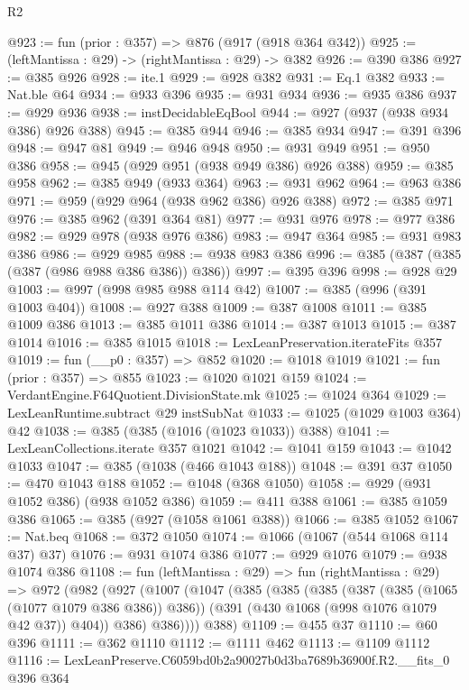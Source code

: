 \begin{lexlean}{R2}
\begin{coremodule}
@923 := fun (prior : @357) => @876 (@917 (@918 @364 @342))
@925 := (leftMantissa : @29) -> (rightMantissa : @29) -> @382
@926 := @390 @386
@927 := @385 @926
@928 := ite.{1}
@929 := @928 @382
@931 := Eq.{1} @382
@933 := Nat.ble @64
@934 := @933 @396
@935 := @931 @934
@936 := @935 @386
@937 := @929 @936
@938 := instDecidableEqBool
@944 := @927 (@937 (@938 @934 @386) @926 @388)
@945 := @385 @944
@946 := @385 @934
@947 := @391 @396
@948 := @947 @81
@949 := @946 @948
@950 := @931 @949
@951 := @950 @386
@958 := @945 (@929 @951 (@938 @949 @386) @926 @388)
@959 := @385 @958
@962 := @385 @949 (@933 @364)
@963 := @931 @962
@964 := @963 @386
@971 := @959 (@929 @964 (@938 @962 @386) @926 @388)
@972 := @385 @971
@976 := @385 @962 (@391 @364 @81)
@977 := @931 @976
@978 := @977 @386
@982 := @929 @978 (@938 @976 @386)
@983 := @947 @364
@985 := @931 @983 @386
@986 := @929 @985
@988 := @938 @983 @386
@996 := @385 (@387 (@385 (@387 (@986 @988 @386 @386)) @386))
@997 := @395 @396
@998 := @928 @29
@1003 := @997 (@998 @985 @988 @114 @42)
@1007 := @385 (@996 (@391 @1003 @404))
@1008 := @927 @388
@1009 := @387 @1008
@1011 := @385 @1009 @386
@1013 := @385 @1011 @386
@1014 := @387 @1013
@1015 := @387 @1014
@1016 := @385 @1015
@1018 := LexLeanPreservation.iterateFits @357
@1019 := fun (__p0 : @357) => @852
@1020 := @1018 @1019
@1021 := fun (prior : @357) => @855
@1023 := @1020 @1021 @159
@1024 := VerdantEngine.F64Quotient.DivisionState.mk
@1025 := @1024 @364
@1029 := LexLeanRuntime.subtract @29 instSubNat
@1033 := @1025 (@1029 @1003 @364) @42
@1038 := @385 (@385 (@1016 (@1023 @1033)) @388)
@1041 := LexLeanCollections.iterate @357 @1021
@1042 := @1041 @159
@1043 := @1042 @1033
@1047 := @385 (@1038 (@466 @1043 @188))
@1048 := @391 @37
@1050 := @470 @1043 @188
@1052 := @1048 (@368 @1050)
@1058 := @929 (@931 @1052 @386) (@938 @1052 @386)
@1059 := @411 @388
@1061 := @385 @1059 @386
@1065 := @385 (@927 (@1058 @1061 @388))
@1066 := @385 @1052
@1067 := Nat.beq
@1068 := @372 @1050
@1074 := @1066 (@1067 (@544 @1068 @114 @37) @37)
@1076 := @931 @1074 @386
@1077 := @929 @1076
@1079 := @938 @1074 @386
@1108 := fun (leftMantissa : @29) =>
  fun (rightMantissa : @29) =>
  @972
    (@982
      (@927
        (@1007
          (@1047
            (@385
              (@385
                (@385
                  (@387 (@385 (@1065 (@1077 @1079 @386 @386)) @386))
                  (@391 (@430 @1068 (@998 @1076 @1079 @42 @37)) @404))
                @386)
              @386))))
      @388)
@1109 := @455 @37
@1110 := @60 @396
@1111 := @362 @1110
@1112 := @1111 @462
@1113 := @1109 @1112
@1116 := LexLeanPreserve.C6059bd0b2a90027b0d3ba7689b36900f.R2.__fits_0 @396 @364

\end{coremodule}
\end{lexlean}
